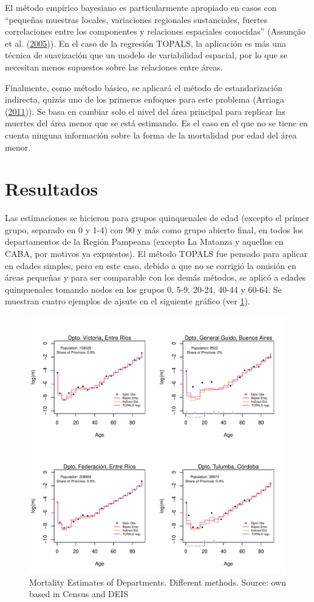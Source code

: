 \documentclass[12pt,]{article}
\begin{document}
El método empírico bayesiano es particularmente apropiado en casos con
``pequeñas muestras locales, variaciones regionales sustanciales,
fuertes correlaciones entre los componentes y relaciones espaciales
conocidas'' (Assunção et al.
(\protect\hyperlink{ref-Assuncao2005}{2005})). En el caso de la
regresión TOPALS, la aplicación es más una técnica de suavización que un
modelo de variabilidad espacial, por lo que se necesitan menos supuestos
sobre las relaciones entre áreas.

Finalmente, como método básico, se aplicará el método de estandarización
indirecta, quizás uno de los primeros enfoques para este problema
(Arriaga (\protect\hyperlink{ref-Arriaga2011}{2011})). Se basa en
cambiar solo el nivel del área principal para replicar las muertes del
área menor que se está estimando. Es el caso en el que no se tiene en
cuenta ninguna información sobre la forma de la mortalidad por edad del
área menor.

\hypertarget{resultados}{%
\section{\texorpdfstring{\textbf{Resultados}}{Resultados}}\label{resultados}}

Las estimaciones se hicieron para grupos quinquenales de edad (excepto
el primer grupo, separado en 0 y 1-4) con 90 y más como grupo abierto
final, en todos los departamentos de la Región Pampeana (excepto La
Matanza y aquellos en CABA, por motivos ya expuestos). El método TOPALS
fue pensado para aplicar en edades simples, pero en este caso, debido a
que no se corrigió la omisión en áreas pequeñas y para ser comparable
con los demás métodos, se aplicó a edades quinquenales tomando nodos en
los grupos 0, 5-9, 20-24, 40-44 y 60-64. Se muestran cuatro ejemplos de
ajsute en el siguiente gráfico (ver \ref{fig:Ajuste}).

\begin{figure}

{\centering \includegraphics[width=0.7\linewidth]{analysis/plots/Ajuste} 

}

\caption{Mortality Estimates of Departments. Different methods. Source: own based in Census and DEIS}\label{fig:Ajuste}
\end{figure}
\end{document}
